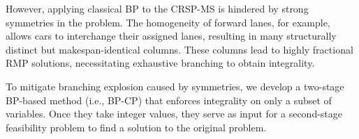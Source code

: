 \documentclass[12pt]{article}
\begin{document}

However, applying classical BP to the CRSP-MS is hindered by strong symmetries in the problem. The homogeneity of forward lanes, for example, allows cars to interchange their assigned lanes, resulting in many structurally distinct but makespan-identical columns. These columns lead to highly fractional RMP solutions, necessitating exhaustive branching to obtain integrality.



To mitigate branching explosion caused by symmetries, we develop a two-stage BP-based method (i.e., BP-CP) that enforces integrality on only a subset of variables. Once they take integer values, they serve as input for a second-stage feasibility problem to find a solution to the original problem.



\end{document}
